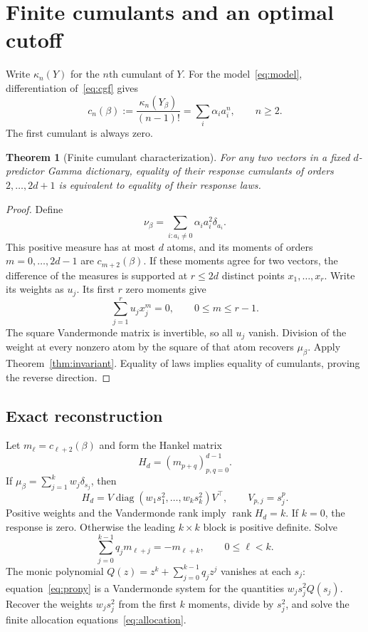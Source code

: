 \documentclass[11pt]{article}
\newtheorem{theorem}{Theorem}[section]
\theoremstyle{definition}\newtheorem{definition}[theorem]{Definition}
\theoremstyle{remark}\newtheorem{remark}[theorem]{Remark}
\DeclareMathOperator{\rank}{rank}
\begin{document}
\section{Finite cumulants and an optimal cutoff}\label{sec:reconstruction}
Write $\kappa_n(Y)$ for the $n$th cumulant of $Y$. For the model~\eqref{eq:model}, differentiation of~\eqref{eq:cgf} gives
\begin{equation}\label{eq:cumulants}
 c_n(\beta):=\frac{\kappa_n(Y_\beta)}{(n-1)!}
 =\sum_i\alpha_i a_i^n,\qquad n\ge2.
\end{equation}
The first cumulant is always zero.

\begin{theorem}[Finite cumulant characterization]\label{thm:cumulants}
For any two vectors in a fixed $d$-predictor Gamma dictionary, equality of their response cumulants of orders $2,\ldots,2d+1$ is equivalent to equality of their response laws.
\end{theorem}
\begin{proof}
Define
\[
 \nu_\beta=\sum_{i:a_i\ne0}\alpha_i a_i^2\delta_{a_i}.
\]
This positive measure has at most $d$ atoms, and its moments of orders $m=0,\ldots,2d-1$ are $c_{m+2}(\beta)$. If these moments agree for two vectors, the difference of the measures is supported at $r\le2d$ distinct points $x_1,\ldots,x_r$. Write its weights as $u_j$. Its first $r$ zero moments give
\[
 \sum_{j=1}^r u_jx_j^m=0,\qquad 0\le m\le r-1.
\]
The square Vandermonde matrix is invertible, so all $u_j$ vanish. Division of the weight at every nonzero atom by the square of that atom recovers $\mu_\beta$. Apply Theorem~\ref{thm:invariant}. Equality of laws implies equality of cumulants, proving the reverse direction.
\end{proof}

\subsection{Exact reconstruction}
Let $m_\ell=c_{\ell+2}(\beta)$ and form the Hankel matrix
\[
 H_d=(m_{p+q})_{p,q=0}^{d-1}.
\]
If $\mu_\beta=\sum_{j=1}^k w_j\delta_{s_j}$, then
\[
 H_d=V\operatorname{diag}(w_1s_1^2,\ldots,w_ks_k^2)V^\top,
 \qquad V_{p,j}=s_j^p.
\]
Positive weights and the Vandermonde rank imply $\rank H_d=k$. If $k=0$, the response is zero. Otherwise the leading $k\times k$ block is positive definite. Solve
\begin{equation}\label{eq:prony}
 \sum_{j=0}^{k-1}q_jm_{\ell+j}=-m_{\ell+k},\qquad 0\le\ell<k.
\end{equation}
The monic polynomial $Q(z)=z^k+\sum_{j=0}^{k-1}q_jz^j$ vanishes at each $s_j$: equation~\eqref{eq:prony} is a Vandermonde system for the quantities $w_js_j^2Q(s_j)$. Recover the weights $w_js_j^2$ from the first $k$ moments, divide by $s_j^2$, and solve the finite allocation equations~\eqref{eq:allocation}.
\end{document}
